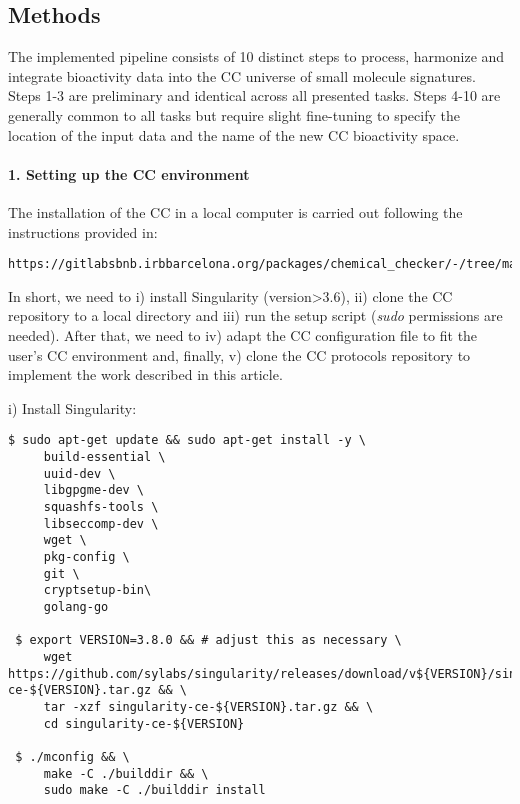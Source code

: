 \subsection{Methods}
\label{Protocols_Methods}

The implemented pipeline consists of 10 distinct steps to process, harmonize and integrate bioactivity data into the CC universe of small molecule signatures. Steps 1-3 are preliminary and identical across all presented tasks. Steps 4-10 are generally common to all tasks but require slight fine-tuning to specify the location of the input data and the name of the new CC bioactivity space.

\paragraph{1. Setting up the CC environment} \leavevmode

The installation of the CC in a local computer is carried out following the instructions provided in: \\

\begin{lstlisting}
https://gitlabsbnb.irbbarcelona.org/packages/chemical_checker/-/tree/master
\end{lstlisting}

In short, we need to i) install Singularity (version>3.6), ii) clone the CC repository to a local directory and iii) run the setup script (\textit{sudo} permissions are needed). After that, we need to iv) adapt the CC configuration file to fit the user’s CC environment and, finally, v) clone the CC protocols repository to implement the work described in this article.

i) Install Singularity: \\

\begin{lstlisting}
$ sudo apt-get update && sudo apt-get install -y \
     build-essential \
     uuid-dev \
     libgpgme-dev \
     squashfs-tools \
     libseccomp-dev \
     wget \
     pkg-config \
     git \
     cryptsetup-bin\
     golang-go

 $ export VERSION=3.8.0 && # adjust this as necessary \
     wget https://github.com/sylabs/singularity/releases/download/v${VERSION}/singularity-ce-${VERSION}.tar.gz && \
     tar -xzf singularity-ce-${VERSION}.tar.gz && \
     cd singularity-ce-${VERSION}

 $ ./mconfig && \
     make -C ./builddir && \
     sudo make -C ./builddir install
\end{lstlisting}


